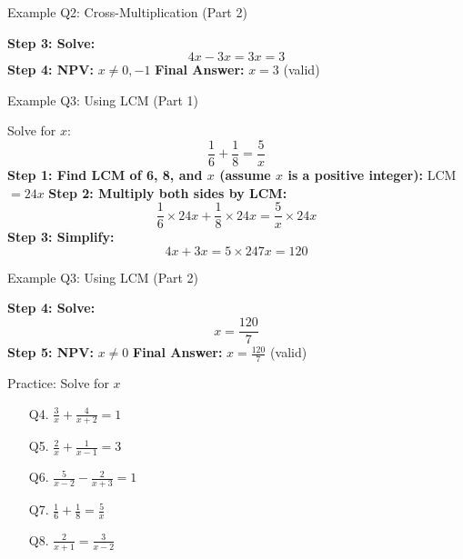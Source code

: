 \documentclass[aspectratio=169]{beamer}
\begin{document}
\begin{frame}{Example Q2: Cross-Multiplication (Part 2)}
\begin{tcolorbox}[colback=lightgray,colframe=secondary,title=Example Q2 (Part 2)]
\footnotesize
\textbf{Step 3: Solve:}
\[
4x - 3x = 3
x = 3
\]
\textbf{Step 4: NPV:} $x \neq 0, -1$
\textbf{Final Answer:} $x=3$ (valid)
\end{tcolorbox}
\end{frame}

\begin{frame}{Example Q3: Using LCM (Part 1)}
\begin{tcolorbox}[colback=lightgray,colframe=secondary,title=Example Q3 (Part 1)]
\footnotesize
Solve for $x$:
\[
\frac{1}{6} + \frac{1}{8} = \frac{5}{x}
\]
\textbf{Step 1: Find LCM of 6, 8, and $x$ (assume $x$ is a positive integer):} LCM$=24x$
\textbf{Step 2: Multiply both sides by LCM:}
\[
\frac{1}{6} \times 24x + \frac{1}{8} \times 24x = \frac{5}{x} \times 24x
\]
\textbf{Step 3: Simplify:}
\[
4x + 3x = 5 \times 24
7x = 120
\]
\end{tcolorbox}
\end{frame}

\begin{frame}{Example Q3: Using LCM (Part 2)}
\begin{tcolorbox}[colback=lightgray,colframe=secondary,title=Example Q3 (Part 2)]
\footnotesize
\textbf{Step 4: Solve:}
\[
x = \frac{120}{7}
\]
\textbf{Step 5: NPV:} $x \neq 0$
\textbf{Final Answer:} $x=\frac{120}{7}$ (valid)
\end{tcolorbox}
\end{frame}

\begin{frame}{Practice: Solve for $x$}
\begin{tcolorbox}[colback=lightgray,colframe=primary,title=Practice Problems]
\footnotesize
\begin{enumerate}
  \item[Q4.] $\frac{3}{x} + \frac{4}{x+2} = 1$
  \item[Q5.] $\frac{2}{x} + \frac{1}{x-1} = 3$
  \item[Q6.] $\frac{5}{x-2} - \frac{2}{x+3} = 1$
  \item[Q7.] $\frac{1}{6} + \frac{1}{8} = \frac{5}{x}$
  \item[Q8.] $\frac{2}{x+1} = \frac{3}{x-2}$
\end{enumerate}
\end{tcolorbox}
\end{frame}
\end{document}
